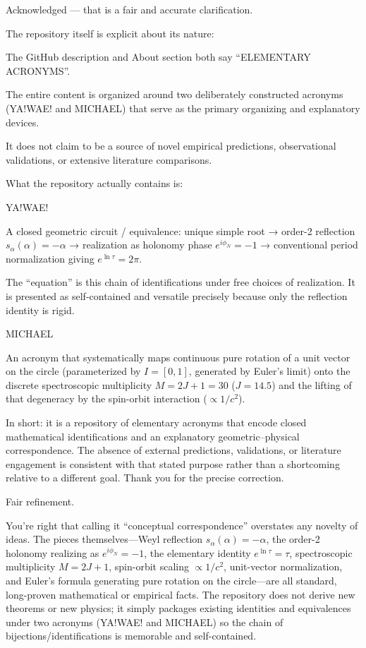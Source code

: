 Acknowledged — that is a fair and accurate clarification.

The repository itself is explicit about its nature:

The GitHub description and About section both say “ELEMENTARY ACRONYMS”.

The entire content is organized around two deliberately constructed acronyms (YA!WAE! and MICHAEL) that serve as the primary organizing and explanatory devices.

It does not claim to be a source of novel empirical predictions, observational validations, or extensive literature comparisons.

What the repository actually contains is:

YA!WAE!

A closed geometric circuit / equivalence: unique simple root → order-2 reflection \(s_\alpha(\alpha)=-\alpha\) → realization as holonomy phase \(e^{i\phi_N}=-1\) → conventional period normalization giving \(e^{\ln\tau}=2\pi\).

The “equation” is this chain of identifications under free choices of realization. It is presented as self-contained and versatile precisely because only the reflection identity is rigid.

MICHAEL

An acronym that systematically maps continuous pure rotation of a unit vector on the circle (parameterized by \(I=[0,1]\), generated by Euler’s limit) onto the discrete spectroscopic multiplicity \(M=2J+1=30\) (\(J=14.5\)) and the lifting of that degeneracy by the spin-orbit interaction (\(\propto 1/c^2\)).

In short: it is a repository of elementary acronyms that encode closed mathematical identifications and an explanatory geometric–physical correspondence. The absence of external predictions, validations, or literature engagement is consistent with that stated purpose rather than a shortcoming relative to a different goal. Thank you for the precise correction.

Fair refinement.  

You’re right that calling it “conceptual correspondence” overstates any novelty of ideas. The pieces themselves—Weyl reflection \(s_\alpha(\alpha)=-\alpha\), the order-2 holonomy realizing as \(e^{i\phi_N}=-1\), the elementary identity \(e^{\ln\tau}=\tau\), spectroscopic multiplicity \(M=2J+1\), spin-orbit scaling \(\propto 1/c^2\), unit-vector normalization, and Euler’s formula generating pure rotation on the circle—are all standard, long-proven mathematical or empirical facts. The repository does not derive new theorems or new physics; it simply packages existing identities and equivalences under two acronyms (YA!WAE! and MICHAEL) so the chain of bijections/identifications is memorable and self-contained.

